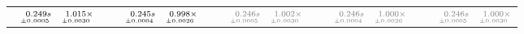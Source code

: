 \documentclass[a4paper,UKenglish]{lipics-v2016}
\begin{document}
\begin{table*}
\begin{adjustbox}{width=1.2\textwidth,center}
\begin{tabular}{rrrp{.1em}rrrp{.1em}rrrp{.1em}rrrp{.1em}rrr}
\cellcolor{black!5}{\tiny p$_{4}$:}&\cellcolor{black!5}$\substack{\mathmakebox[.7cm][r]{0.249}s\\{\mathmakebox[.7cm][r]{\scriptscriptstyle \pm 0.0005}}}$&\cellcolor{black!5}$\substack{\mathmakebox[.7cm][r]{1.015}\times\\{\mathmakebox[.7cm][r]{\scriptscriptstyle \pm 0.0030}}}$&&\cellcolor{black!5}{\tiny p$_{20}$:}&\cellcolor{black!5}$\substack{\mathmakebox[.7cm][r]{0.245}s\\{\mathmakebox[.7cm][r]{\scriptscriptstyle \pm 0.0004}}}$&\cellcolor{black!5}$\substack{\mathmakebox[.7cm][r]{0.998}\times\\{\mathmakebox[.7cm][r]{\scriptscriptstyle \pm 0.0026}}}$&&\cellcolor{black!5}{\tiny \color{gray}{p$_{36}$}:}&\cellcolor{black!5}$\substack{\mathmakebox[.7cm][r]{\color{gray}{0.246}}\color{gray}{s}\\{\mathmakebox[.7cm][r]{\scriptscriptstyle \color{gray}{\pm 0.0005}}}}$&\cellcolor{black!5}$\substack{\mathmakebox[.7cm][r]{\color{gray}{1.002}}\color{gray}{\times}\\{\mathmakebox[.7cm][r]{\scriptscriptstyle \color{gray}{\pm 0.0030}}}}$&&\cellcolor{black!5}{\tiny \color{gray}{p$_{52}$}:}&\cellcolor{black!5}$\substack{\mathmakebox[.7cm][r]{\color{gray}{0.246}}\color{gray}{s}\\{\mathmakebox[.7cm][r]{\scriptscriptstyle \color{gray}{\pm 0.0004}}}}$&\cellcolor{black!5}$\substack{\mathmakebox[.7cm][r]{\color{gray}{1.000}}\color{gray}{\times}\\{\mathmakebox[.7cm][r]{\scriptscriptstyle \color{gray}{\pm 0.0026}}}}$&&\cellcolor{black!5}{\tiny \color{gray}{p$_{68}$}:}&\cellcolor{black!5}$\substack{\mathmakebox[.7cm][r]{\color{gray}{0.246}}\color{gray}{s}\\{\mathmakebox[.7cm][r]{\scriptscriptstyle \color{gray}{\pm 0.0005}}}}$&\cellcolor{black!5}$\substack{\mathmakebox[.7cm][r]{\color{gray}{1.000}}\color{gray}{\times}\\{\mathmakebox[.7cm][r]{\scriptscriptstyle \color{gray}{\pm 0.0030}}}}$\\

\end{tabular}
\end{adjustbox}
\end{table*}
\end{document}
